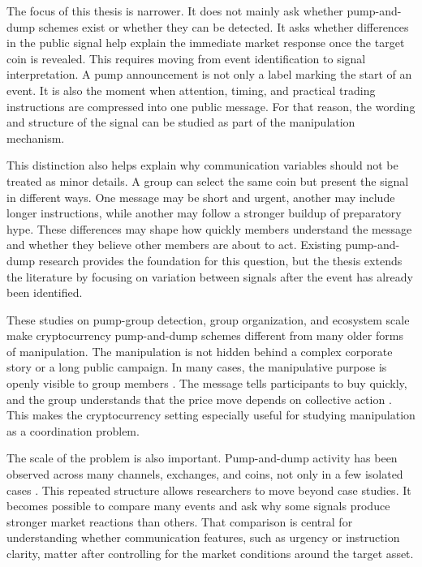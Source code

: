 The focus of this thesis is narrower. It does not mainly ask whether pump-and-dump schemes exist or whether they can be detected. It asks whether differences in the public signal help explain the immediate market response once the target coin is revealed. This requires moving from event identification to signal interpretation. A pump announcement is not only a label marking the start of an event. It is also the moment when attention, timing, and practical trading instructions are compressed into one public message. For that reason, the wording and structure of the signal can be studied as part of the manipulation mechanism.

This distinction also helps explain why communication variables should not be treated as minor details. A group can select the same coin but present the signal in different ways. One message may be short and urgent, another may include longer instructions, while another may follow a stronger buildup of preparatory hype. These differences may shape how quickly members understand the message and whether they believe other members are about to act. Existing pump-and-dump research provides the foundation for this question, but the thesis extends the literature by focusing on variation between signals after the event has already been identified.

These studies on pump-group detection, group organization, and ecosystem scale make cryptocurrency pump-and-dump schemes different from many older forms of manipulation. The manipulation is not hidden behind a complex corporate story or a long public campaign. In many cases, the manipulative purpose is openly visible to group members \cite{dhawan2023new}. The message tells participants to buy quickly, and the group understands that the price move depends on collective action \cite{xu2019anatomy}. This makes the cryptocurrency setting especially useful for studying manipulation as a coordination problem.

The scale of the problem is also important. Pump-and-dump activity has been observed across many channels, exchanges, and coins, not only in a few isolated cases \cite{hamrick2021examination, li2021cryptocurrency}. This repeated structure allows researchers to move beyond case studies. It becomes possible to compare many events and ask why some signals produce stronger market reactions than others. That comparison is central for understanding whether communication features, such as urgency or instruction clarity, matter after controlling for the market conditions around the target asset.

